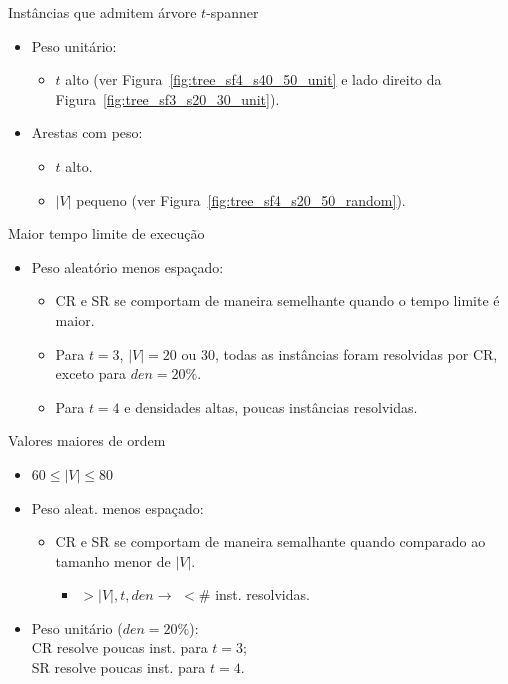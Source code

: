 \documentclass[dvipsnames]{beamer}
\begin{document}
\begin{frame}{Instâncias que admitem árvore $t$-spanner}
  \begin{itemize}
  \item Peso unitário:
    \begin{itemize}
    \item $t$ alto (ver Figura~\ref{fig:tree_sf4_s40_50_unit} e lado direito da
      Figura~\ref{fig:tree_sf3_s20_30_unit}).
    \end{itemize}
  \item Arestas com peso:
    \begin{itemize}
    \item $t$ alto.
      \item $|V|$ pequeno (ver Figura~\ref{fig:tree_sf4_s20_50_random}).
      \end{itemize}
    
  \end{itemize}  
\end{frame}

\begin{frame}{Maior tempo limite de execução}
  \begin{itemize}
  \item Peso aleatório menos espaçado:
    \begin{itemize}
    \item CR e SR se comportam de maneira semelhante quando o tempo limite é maior.
    \item Para $t = 3$, $|V| = 20$ ou $30$, todas as instâncias foram resolvidas por CR, exceto para $den = 20\%$.
    \item Para $t = 4$ e densidades altas, poucas instâncias resolvidas.
    \end{itemize}
  \end{itemize}
\end{frame}

\begin{frame}{Valores maiores de ordem}
  \begin{itemize}
    \item $60 \le |V| \le 80$
    \item Peso aleat. menos espaçado:
    \begin{itemize}
    \item CR e SR se comportam de maneira semalhante quando comparado ao tamanho menor de $|V|$.
      \begin{itemize}
        \item $> |V|, t, den \rightarrow $ $< \#$ inst. resolvidas.
        \end{itemize}
    \end{itemize}
  \item Peso unitário ($den = 20\%$):\\
    CR resolve poucas inst. para $t = 3$;\\
    SR resolve poucas inst. para $t = 4$.
    \end{itemize}
\end{frame}
\end{document}
